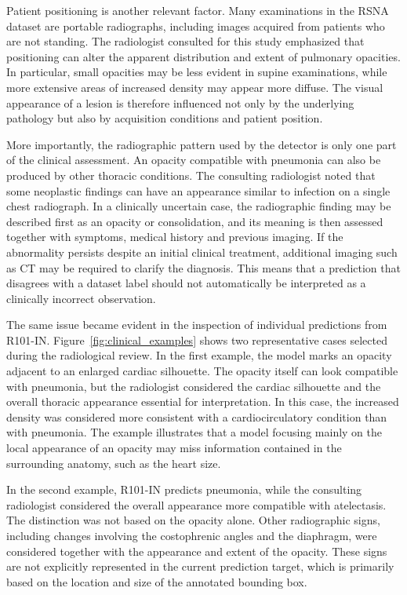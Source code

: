 \documentclass[11pt,a4paper]{article}
\begin{document}
Patient positioning is another relevant factor. Many examinations in the
RSNA dataset are portable radiographs, including images acquired from patients
who are not standing. The radiologist consulted for this study emphasized that
positioning can alter the apparent distribution and extent of pulmonary
opacities. In particular, small opacities may be less evident in supine
examinations, while more extensive areas of increased density may appear more
diffuse. The visual appearance of a lesion is therefore influenced not only by
the underlying pathology but also by acquisition conditions and patient
position.

More importantly, the radiographic pattern used by the detector is only one
part of the clinical assessment. An opacity compatible with pneumonia can also
be produced by other thoracic conditions. The consulting radiologist noted
that some neoplastic findings can have an appearance similar to infection on a
single chest radiograph. In a clinically uncertain case, the radiographic
finding may be described first as an opacity or consolidation, and its meaning
is then assessed together with symptoms, medical history and previous imaging.
If the abnormality persists despite an initial clinical treatment, additional
imaging such as CT may be required to clarify the diagnosis. This means that a
prediction that disagrees with a dataset label should not automatically be
interpreted as a clinically incorrect observation.

The same issue became evident in the inspection of individual predictions from
R101-IN. Figure~\ref{fig:clinical_examples} shows two representative cases
selected during the radiological review. In the first example, the model marks
an opacity adjacent to an enlarged cardiac silhouette. The opacity itself can
look compatible with pneumonia, but the radiologist considered the cardiac
silhouette and the overall thoracic appearance essential for interpretation.
In this case, the increased density was considered more consistent with a
cardiocirculatory condition than with pneumonia. The example illustrates that
a model focusing mainly on the local appearance of an opacity may miss
information contained in the surrounding anatomy, such as the heart size.

In the second example, R101-IN predicts pneumonia, while the consulting
radiologist considered the overall appearance more compatible with atelectasis.
The distinction was not based on the opacity alone. Other radiographic signs,
including changes involving the costophrenic angles and the diaphragm, were
considered together with the appearance and extent of the opacity. These signs
are not explicitly represented in the current prediction target, which is
primarily based on the location and size of the annotated bounding box.
\end{document}
